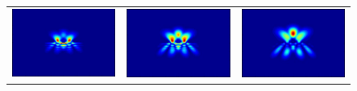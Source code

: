 \begin{figure}[H]
\begin{tabular}{ccc}
  \includegraphics[scale = 0.29]{slit7.png} &   \includegraphics[scale = 0.29]{slit8.png} &   \includegraphics[scale = 0.29]{slit9.png} \\

\end{tabular}
\end{figure}

